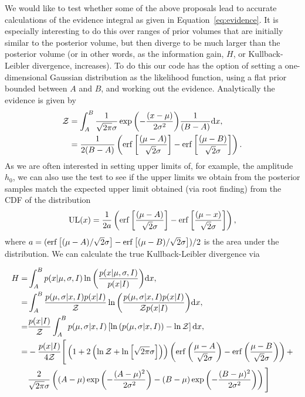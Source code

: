 We would like to test whether some of the above proposals lead to accurate calculations of the evidence integral as given in Equation~\ref{eq:evidence}.
It is especially interesting to do this over ranges of prior volumes that are initially similar to the posterior volume, but then diverge to be
much larger than the posterior volume (or in other words, as the information gain, $H$, or Kullback-Leibler divergence, increases). To do this our
code has the option of setting a one-dimensional Gaussian distribution as the likelihood function, using a flat prior bounded between $A$ and $B$,
and working out the evidence. Analytically the evidence is given by
\begin{align}\label{eq:testgaussev}
 \mathcal{Z} &= \int_A^B \frac{1}{\sqrt{2\pi}\sigma}\exp{\left(-\frac{(x-\mu)}{2\sigma^2} \right)}\frac{1}{(B-A)} \text{d}x, \nonumber \\
   &= \frac{1}{2(B-A)}\left(\operatorname{erf}{\left[\frac{(\mu-A)}{\sqrt{2}\sigma}\right]}-\operatorname{erf}{\left[\frac{(\mu-B)}{\sqrt{2}\sigma}\right]}\right).
\end{align}
As we are often interested in setting upper limits of, for example, the \gw amplitude $h_0$, we can also use the test to see if the
upper limits we obtain from the posterior samples match the expected upper limit obtained (via root finding) from the CDF of the distribution
\begin{equation}\label{eq:testcdf}
 \text{UL}(x) = \frac{1}{2a}\left(\operatorname{erf}{\left[\frac{(\mu-A)}{\sqrt{2}\sigma}\right]} - \operatorname{erf}{\left[\frac{(\mu-x)}{\sqrt{2}\sigma}\right]}\right),
\end{equation}
where $a = (\operatorname{erf}{\left[(\mu - A)/\sqrt{2}\sigma\right]} - \operatorname{erf}{\left[(\mu - B)/\sqrt{2}\sigma\right]})/2$ is the area under the distribution.
We can calculate the true Kullback-Leibler divergence via
\begin{widetext}
\begin{align}\label{eq:kldiv}
H =& \int_A^B p(x|\mu,\sigma,I) \ln{\left(\frac{p(x|\mu,\sigma,I)}{p(x|I)}\right)} \text{d}x, \nonumber \\ 
 =& \int_A^B \frac{p(\mu,\sigma|x,I)p(x|I)}{\mathcal{Z}} \ln{\left(\frac{p(\mu,\sigma|x,I)p(x|I)}{\mathcal{Z}p(x|I)}\right)} \text{d}x, \nonumber \\
 =& \frac{p(x|I)}{\mathcal{Z}} \int_A^B p(\mu,\sigma|x,I) \left[\ln{\left( p(\mu,\sigma|x,I) \right)} - \ln{\mathcal{Z}}\right] \text{d}x, \nonumber \\
 =& -\frac{p(x|I)}{4\mathcal{Z}}\Bigg[ \left(1+2\left(\ln{\mathcal{Z}} 
+\ln{\left[\sqrt{2\pi}\sigma\right]}\right)\right)\left(\operatorname{erf}{\left(\frac{\mu-A}{\sqrt{2}\sigma}\right)}-\operatorname{erf}{\left(\frac{\mu-B}{\sqrt{2}\sigma}\right)} \right) + \nonumber \\
 & \frac{2}{\sqrt{2\pi}\sigma}\left((A-\mu)\exp{\left(-\frac{(A-\mu)^2}{2\sigma^2}\right)} - (B-\mu)\exp{\left(-\frac{(B-\mu)^2}{2\sigma^2}\right)}  \right) \Bigg]
\end{align}
\end{widetext}
